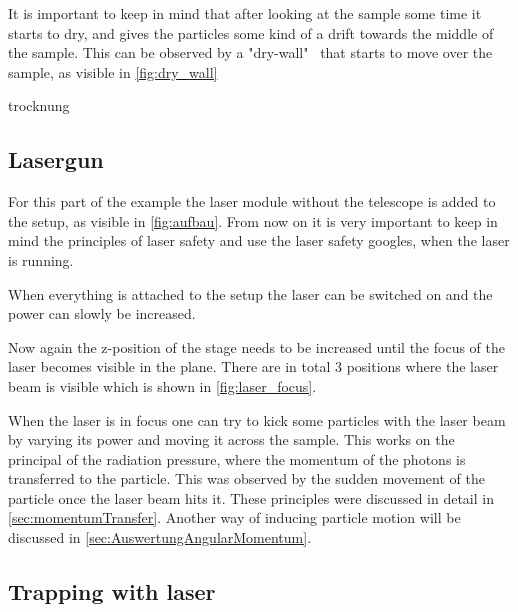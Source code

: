 \documentclass[12pt,english,ngerman]{scrartcl}
\begin{document}
It is important to keep in mind that after looking at the sample some time it
starts to dry, and gives the particles some kind of a drift towards the middle
of the sample. This can be observed by a "dry-wall" \ that starts to move over
the sample, as visible in \autoref{fig:dry_wall}


trocknung
\subsection{Lasergun}

For this part of the example the laser module without the telescope is added to
the setup, as visible in \autoref{fig:aufbau}. From now on it is very important
to keep in mind the principles of laser safety and use the laser safety
googles, when the laser is running.

When everything is attached to the setup the laser can be switched on and the
power can slowly be increased.

Now again the z-position of the stage needs to be increased until the focus of
the laser becomes visible in the plane. There are in total 3 positions where
the laser beam is visible which is shown in \autoref{fig:laser_focus}.


When the laser is in focus one can try to kick some particles with the laser
beam by varying its power and moving it across the sample. This works on the
principal of the radiation pressure, where the momentum of the photons is
transferred to the particle. This was observed by the sudden movement of the
particle once the laser beam hits it. These principles were discussed in detail
in \autoref{sec:momentumTransfer}. Another way of inducing particle motion will
be discussed in \autoref{sec:AuswertungAngularMomentum}.

\subsection{Trapping with laser}
\end{document}
